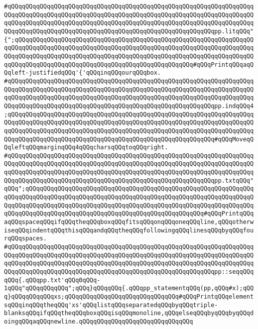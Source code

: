 \verb|#qQQqqQQqqQQqqQQqqQQqqQQqqQQqqQQqqQQqqQQqqQQqqQQqqQQqqQQqqQQqqQQqqQQqqQQqqQQqqQQqqQQqqQQqqQQqqQQqqQQqqQQqqQQqqQQqqQQqqQQqqQQqqQQqqQQqqQQqqQQqqQQqqQQqqQQqqQQqqQQqqQQqqQQqqQQqqQQqqQQqqQQqqQQqqQQqqQQqqQQqqQQqqQQqqQQqqQQqqQQqqQQqqQQqqQQqqQQqqQQqqQQqqQQqqQQqqQQqqQQqqQQqqQQqpp.litqQQq"{";qQQqqQQqqQQqqQQqqQQqqQQqqQQqqQQqqQQqqQQqqQQqqQQqqQQqqQQqqQQqqQQqqQQqqQQqqQQqqQQqqQQqqQQqqQQqqQQqqQQqqQQqqQQqqQQqqQQqqQQqqQQqqQQqqQQqqQQqqQQqqQQqqQQqqQQqqQQqqQQqqQQqqQQqqQQqqQQqqQQqqQQqqQQqqQQqqQQqqQQqqQQqqQQqqQQqqQQqqQQqqQQqqQQqqQQqqQQqqQQqqQQqqQQqqQQqqQQqqQQq#qQQqPrintqQQqaqQQqleft-justifiedqQQq'{'qQQqinqQQqourqQQqbox.|\newline
\verb|#qQQqqQQqqQQqqQQqqQQqqQQqqQQqqQQqqQQqqQQqqQQqqQQqqQQqqQQqqQQqqQQqqQQqqQQqqQQqqQQqqQQqqQQqqQQqqQQqqQQqqQQqqQQqqQQqqQQqqQQqqQQqqQQqqQQqqQQqqQQqqQQqqQQqqQQqqQQqqQQqqQQqqQQqqQQqqQQqqQQqqQQqqQQqqQQqqQQqqQQqqQQqqQQqqQQqqQQqqQQqqQQqqQQqqQQqqQQqqQQqqQQqqQQqqQQqqQQqqQQqqQQqqQQqpp.indqQQq4;qQQqqQQqqQQqqQQqqQQqqQQqqQQqqQQqqQQqqQQqqQQqqQQqqQQqqQQqqQQqqQQqqQQqqQQqqQQqqQQqqQQqqQQqqQQqqQQqqQQqqQQqqQQqqQQqqQQqqQQqqQQqqQQqqQQqqQQqqQQqqQQqqQQqqQQqqQQqqQQqqQQqqQQqqQQqqQQqqQQqqQQqqQQqqQQqqQQqqQQqqQQqqQQqqQQqqQQqqQQqqQQqqQQqqQQqqQQqqQQqqQQqqQQqqQQqqQQqqQQqqQQqqQQq#qQQqMoveqQQqleftqQQqmarginqQQq4qQQqcharsqQQqtoqQQqright.|\newline
\verb|#qQQqqQQqqQQqqQQqqQQqqQQqqQQqqQQqqQQqqQQqqQQqqQQqqQQqqQQqqQQqqQQqqQQqqQQqqQQqqQQqqQQqqQQqqQQqqQQqqQQqqQQqqQQqqQQqqQQqqQQqqQQqqQQqqQQqqQQqqQQqqQQqqQQqqQQqqQQqqQQqqQQqqQQqqQQqqQQqqQQqqQQqqQQqqQQqqQQqqQQqqQQqqQQqqQQqqQQqqQQqqQQqqQQqqQQqqQQqqQQqqQQqqQQqqQQqqQQqqQQqqQQqqQQqpp.txtqQQq"qQQq";qQQqqQQqqQQqqQQqqQQqqQQqqQQqqQQqqQQqqQQqqQQqqQQqqQQqqQQqqQQqqQQqqQQqqQQqqQQqqQQqqQQqqQQqqQQqqQQqqQQqqQQqqQQqqQQqqQQqqQQqqQQqqQQqqQQqqQQqqQQqqQQqqQQqqQQqqQQqqQQqqQQqqQQqqQQqqQQqqQQqqQQqqQQqqQQqqQQqqQQqqQQqqQQqqQQqqQQqqQQqqQQqqQQqqQQqqQQqqQQqqQQqqQQqqQQqqQQqqQQq#qQQqPrintqQQqaqQQqspaceqQQqifqQQqtheqQQqboxqQQqfitsqQQqonqQQqoneqQQqline,qQQqotherwiseqQQqindentqQQqthisqQQqandqQQqtheqQQqfollowingqQQqlinesqQQqbyqQQqfourqQQqspaces.|\newline
\verb|#qQQqqQQqqQQqqQQqqQQqqQQqqQQqqQQqqQQqqQQqqQQqqQQqqQQqqQQqqQQqqQQqqQQqqQQqqQQqqQQqqQQqqQQqqQQqqQQqqQQqqQQqqQQqqQQqqQQqqQQqqQQqqQQqqQQqqQQqqQQqqQQqqQQqqQQqqQQqqQQqqQQqqQQqqQQqqQQqqQQqqQQqqQQqqQQqqQQqqQQqqQQqqQQqqQQqqQQqqQQqqQQqqQQqqQQqqQQqqQQqqQQqqQQqqQQqqQQqqQQqqQQqqQQqpp::seqqQQqqQQq{.qQQqpp.txt'qQQq0qQQq-1qQQq"qQQqqQQqqQQq";qQQq}qQQqqQQq{.qQQqpp_statementqQQq(pp,qQQq#x);qQQq}qQQqqQQqqQQqxs;qQQqqQQqqQQqqQQqqQQqqQQqqQQqqQQq#qQQqPrintqQQqelementsqQQqinqQQqtheqQQq'xs'qQQqlistqQQqseparatedqQQqbyqQQqtriple-blanksqQQqifqQQqtheqQQqboxqQQqisqQQqmonoline,qQQqelseqQQqbyqQQqbyqQQqdoingqQQqaqQQqnewline.qQQqqQQqqQQqqQQqqQQqqQQqqQQqqQQq|\newline
